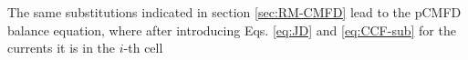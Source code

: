 %
%
The same substitutions indicated in section \ref{sec:RM-CMFD} lead to the pCMFD balance equation, where after introducing Eqs. \ref{eq:JD} and \ref{eq:CCF-sub} for the currents it is in the $i$-th cell
